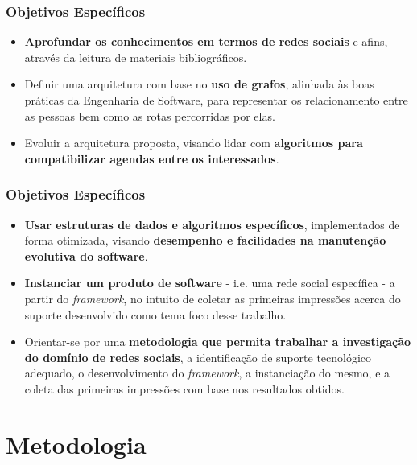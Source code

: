 \documentclass{beamer}
\begin{document}
\begin{frame}
\frametitle{Objetivos Específicos}

\begin{itemize}
	\item \textbf{Aprofundar os conhecimentos em termos de redes sociais} e afins, através da leitura de materiais bibliográficos.
	\item Definir uma arquitetura com base no \textbf{uso de grafos}, alinhada às boas práticas da Engenharia de Software, para representar os relacionamento entre as pessoas bem como as rotas percorridas por elas.
	\item Evoluir a arquitetura proposta, visando lidar com \textbf{algoritmos para compatibilizar agendas entre os interessados}.
\end{itemize}

\end{frame}

\begin{frame}
\frametitle{Objetivos Específicos}

\begin{itemize}
	\item \textbf{Usar estruturas de dados e algoritmos específicos}, implementados de forma otimizada, visando \textbf{desempenho e facilidades na manutenção evolutiva do software}.
	\item \textbf{Instanciar um produto de software} - i.e. uma rede social específica - a partir do \textit{framework}, no intuito de coletar as primeiras impressões acerca do suporte desenvolvido como tema foco desse trabalho.
	\item Orientar-se por uma \textbf{metodologia que permita trabalhar a investigação do domínio de redes sociais}, a identificação de suporte tecnológico adequado, o desenvolvimento do \textit{framework}, a instanciação do mesmo, e a coleta das primeiras impressões com base nos resultados obtidos.
\end{itemize}

\end{frame}

\section{Metodologia}
\end{document}
